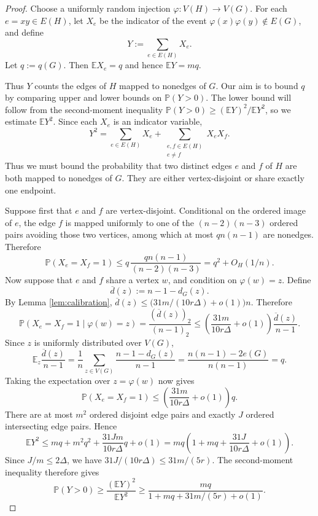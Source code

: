 \documentclass[11pt]{article}
\numberwithin{equation}{section}
\theoremstyle{definition}
\theoremstyle{remark}
\newcommand{\E}{\mathbb E}
\newcommand{\Prb}{\mathbb P}
\begin{document}
\begin{proof}
Choose a uniformly random injection $\varphi:V(H)\to V(G)$. For each $e=xy\in E(H)$, let $X_e$ be the indicator of the event $\varphi(x)\varphi(y)\notin E(G)$, and define
\[
Y:=\sum_{e\in E(H)}X_e.
\]
Let $q:=q(G)$. Then $\E X_e=q$ and hence $\E Y=mq$.

Thus $Y$ counts the edges of $H$ mapped to nonedges of $G$. Our aim is to bound $q$ by comparing upper and lower bounds on $\Prb(Y>0)$. The lower bound will follow from the second-moment inequality $\Prb(Y>0)\ge (\E Y)^2/\E Y^2$, so we estimate $\E Y^2$. Since each $X_e$ is an indicator variable,
\[
Y^2=\sum_{e\in E(H)}X_e+
\sum_{\substack{e,f\in E(H)\\ e\ne f}}X_eX_f.
\]
Thus we must bound the probability that two distinct edges $e$ and $f$ of $H$ are both mapped to nonedges of $G$. They are either vertex-disjoint or share exactly one endpoint.

Suppose first that $e$ and $f$ are vertex-disjoint. Conditional on the ordered image of $e$, the edge $f$ is mapped uniformly to one of the $(n-2)(n-3)$ ordered pairs avoiding those two vertices, among which at most $qn(n-1)$ are nonedges. Therefore
\[
\Prb(X_e=X_f=1)
\le q\,\frac{qn(n-1)}{(n-2)(n-3)}
=q^2+O_H(1/n).
\]
Now suppose that $e$ and $f$ share a vertex $w$, and condition on $\varphi(w)=z$. Define
\[
\overline d(z):=n-1-d_G(z).
\]
By Lemma \ref{lem:calibration},
$\overline d(z)\le \bigl(31m/(10r\Delta)+o(1)\bigr)n$. Therefore
\[
\Prb(X_e=X_f=1\mid \varphi(w)=z)
=\frac{(\overline d(z))_2}{(n-1)_2}
\le \left(\frac{31m}{10r\Delta}+o(1)\right)\frac{\overline d(z)}{n-1}.
\]
Since $z$ is uniformly distributed over $V(G)$,
\[
\E_z\frac{\overline d(z)}{n-1}
=\frac1n\sum_{z\in V(G)}\frac{n-1-d_G(z)}{n-1}
=\frac{n(n-1)-2e(G)}{n(n-1)}
=q.
\]
Taking the expectation over $z=\varphi(w)$ now gives
\[
\Prb(X_e=X_f=1)\le \left(\frac{31m}{10r\Delta}+o(1)\right)q.
\]
There are at most $m^2$ ordered disjoint edge pairs and exactly $J$ ordered intersecting edge pairs. Hence
\[
\E Y^2\le mq+m^2q^2+\frac{31Jm}{10r\Delta}q+o(1)
=mq\left(1+mq+\frac{31J}{10r\Delta}+o(1)\right).
\]
Since $J/m\le2\Delta$, we have $31J/(10r\Delta)\le31m/(5r)$. The second-moment inequality therefore gives
\begin{equation}
\label{eq:Y-positive-lower}
\Prb(Y>0)\ge \frac{(\E Y)^2}{\E Y^2}
\ge \frac{mq}{1+mq+31m/(5r)+o(1)}.
\end{equation}


\end{proof}
\end{document}
